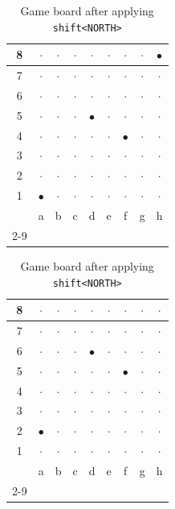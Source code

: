 \documentclass[12pt,a4paper,twoside,openright]{book}
\begin{document}
\begin{table}[H]
\centering
\begin{minipage}{0.45\textwidth}
\centering
\caption{Game board before applying \texttt{shift<NORTH>}}
\label{tab:shift_north_before}
\begin{tabular}{|c|c|c|c|c|c|c|c|c|}
\hline
8 & $\cdot$ & $\cdot$ & $\cdot$ & $\cdot$ & $\cdot$ & $\cdot$ & $\cdot$ & $\bullet$ \\ \hline
7 & $\cdot$ & $\cdot$ & $\cdot$ & $\cdot$ & $\cdot$ & $\cdot$ & $\cdot$ & $\cdot$ \\ \hline
6 & $\cdot$ & $\cdot$ & $\cdot$ & $\cdot$ & $\cdot$ & $\cdot$ & $\cdot$ & $\cdot$ \\ \hline
5 & $\cdot$ & $\cdot$ & $\cdot$ & $\bullet$ & $\cdot$ & $\cdot$ & $\cdot$ & $\cdot$ \\ \hline
4 & $\cdot$ & $\cdot$ & $\cdot$ & $\cdot$ & $\cdot$ & $\bullet$ & $\cdot$ & $\cdot$ \\ \hline
3 & $\cdot$ & $\cdot$ & $\cdot$ & $\cdot$ & $\cdot$ & $\cdot$ & $\cdot$ & $\cdot$ \\ \hline
2 & $\cdot$ & $\cdot$ & $\cdot$ & $\cdot$ & $\cdot$ & $\cdot$ & $\cdot$ & $\cdot$ \\ \hline
1 & $\bullet$ & $\cdot$ & $\cdot$ & $\cdot$ & $\cdot$ & $\cdot$ & $\cdot$ & $\cdot$ \\ \hline
\multicolumn{1}{c|}{} & a & b & c & d & e & f & g & h \\
\cline{2-9}
\end{tabular}
\end{minipage}
\hfill
\begin{minipage}{0.45\textwidth}
\centering
\caption{Game board after applying \texttt{shift<NORTH>}}
\label{tab:shift_north_after}
\begin{tabular}{|c|c|c|c|c|c|c|c|c|}
\hline
8 & $\cdot$ & $\cdot$ & $\cdot$ & $\cdot$ & $\cdot$ & $\cdot$ & $\cdot$ & $\cdot$ \\ \hline
7 & $\cdot$ & $\cdot$ & $\cdot$ & $\cdot$ & $\cdot$ & $\cdot$ & $\cdot$ & $\cdot$ \\ \hline
6 & $\cdot$ & $\cdot$ & $\cdot$ & $\bullet$ & $\cdot$ & $\cdot$ & $\cdot$ & $\cdot$ \\ \hline
5 & $\cdot$ & $\cdot$ & $\cdot$ & $\cdot$ & $\cdot$ & $\bullet$ & $\cdot$ & $\cdot$ \\ \hline
4 & $\cdot$ & $\cdot$ & $\cdot$ & $\cdot$ & $\cdot$ & $\cdot$ & $\cdot$ & $\cdot$ \\ \hline
3 & $\cdot$ & $\cdot$ & $\cdot$ & $\cdot$ & $\cdot$ & $\cdot$ & $\cdot$ & $\cdot$ \\ \hline
2 & $\bullet$ & $\cdot$ & $\cdot$ & $\cdot$ & $\cdot$ & $\cdot$ & $\cdot$ & $\cdot$ \\ \hline
1 & $\cdot$ & $\cdot$ & $\cdot$ & $\cdot$ & $\cdot$ & $\cdot$ & $\cdot$ & $\cdot$ \\ \hline
\multicolumn{1}{c|}{} & a & b & c & d & e & f & g & h \\
\cline{2-9}
\end{tabular}
\end{minipage}
\end{table}
\end{document}
